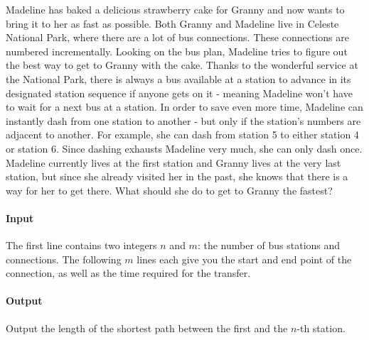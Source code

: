 



\makeheader

Madeline has baked a delicious strawberry cake for Granny and now wants to bring it to her as fast as possible. Both Granny and Madeline live in Celeste National Park, where there are a lot of bus connections. These connections are numbered incrementally. Looking on the bus plan, Madeline tries to figure out the best way to get to Granny with the cake. Thanks to the wonderful service at the National Park, there is always a bus available at a station to advance in its designated station sequence if anyone gets on it - meaning Madeline won't have to wait for a next bus at a station. In order to save even more time, Madeline can instantly dash from one station to another - but only if the station's numbers are adjacent to another. For example, she can dash from station 5 to either station 4 or station 6. Since dashing exhausts Madeline very much, she can only dash once. Madeline currently lives at the first station and Granny lives at the very last station, but since she already visited her in the past, she knows that there is a way for her to get there. What should she do to get to Granny the fastest?

\paragraph*{Input}

The first line contains two integers $n$ and $m$: the number of bus stations and connections.
The following $m$ lines each give you the start and end point of the connection, as well as the time required for the transfer.

\paragraph*{Output}

Output the length of the shortest path between the first and the $n$-th station.

\begin{samples}
\end{samples}

